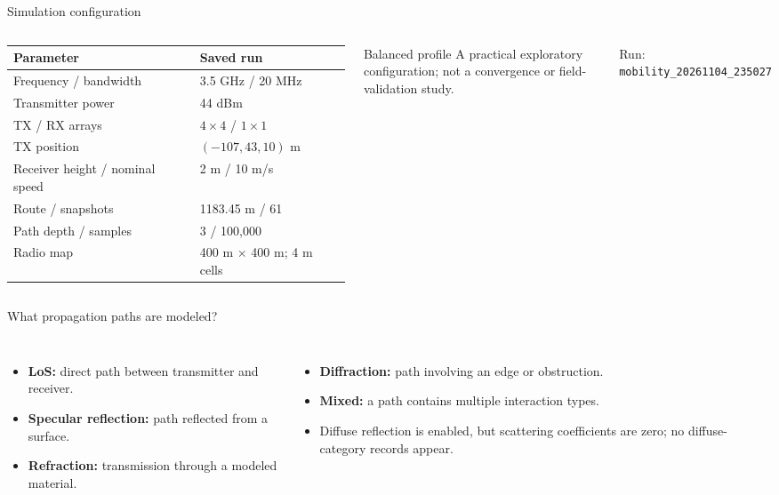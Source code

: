 \documentclass[aspectratio=169,10pt]{beamer}
\begin{document}
\begin{frame}{Simulation configuration}
\begin{columns}[T,onlytextwidth]
\small
\begin{tabular}{@{}ll@{}}\toprule
\textbf{Parameter} & \textbf{Saved run}\\\midrule
Frequency / bandwidth & 3.5 GHz / 20 MHz\\
Transmitter power & 44 dBm\\
TX / RX arrays & $4\times4$ / $1\times1$\\
TX position & $(-107,43,10)$ m\\
Receiver height / nominal speed & 2 m / 10 m/s\\
Route / snapshots & 1183.45 m / 61\\
Path depth / samples & 3 / 100,000\\
Radio map & 400 m $\times$ 400 m; 4 m cells\\\bottomrule
\end{tabular}
\begin{block}{Balanced profile}
A practical exploratory configuration; not a convergence or field-validation study.
\end{block}
\vspace{3pt}\small Run: \texttt{mobility\_20261104\_235027}
\end{columns}
\end{frame}

\begin{frame}{What propagation paths are modeled?}
\begin{columns}[T,onlytextwidth]
\begin{itemize}\setlength\itemsep{8pt}
\item \textbf{LoS:} direct path between transmitter and receiver.
\item \textbf{Specular reflection:} path reflected from a surface.
\item \textbf{Refraction:} transmission through a modeled material.
\end{itemize}
\begin{itemize}\setlength\itemsep{8pt}
\item \textbf{Diffraction:} path involving an edge or obstruction.
\item \textbf{Mixed:} a path contains multiple interaction types.
\item Diffuse reflection is enabled, but scattering coefficients are zero; no diffuse-category records appear.
\end{itemize}
\end{columns}
\end{frame}
\end{document}
